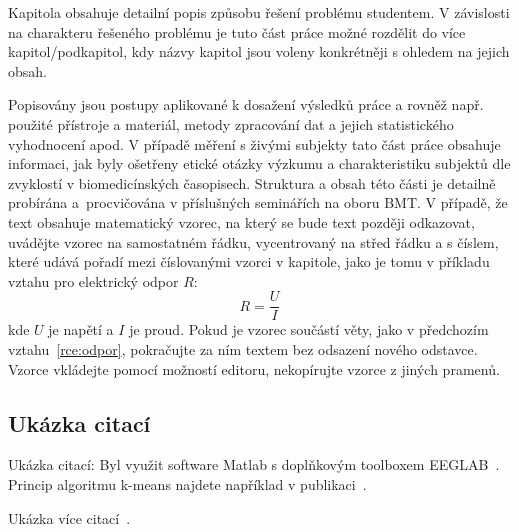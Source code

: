 Kapitola obsahuje detailní popis způsobu řešení problému studentem. 
V závislosti na charakteru řešeného problému je tuto část práce možné rozdělit do více kapitol/podkapitol, kdy názvy kapitol jsou voleny konkrétněji s ohledem na jejich obsah.

Popisovány jsou postupy aplikované k dosažení výsledků práce a rovněž např. použité přístroje a materiál, metody zpracování dat a jejich statistického vyhodnocení apod. 
V případě měření s živými subjekty tato část práce obsahuje informaci, jak byly ošetřeny etické otázky výzkumu a charakteristiku subjektů dle zvyklostí v biomedicínských časopisech.
Struktura a obsah této části je detailně probírána a~procvičována v příslušných seminářích na oboru BMT.
V případě, že text obsahuje matematický vzorec, na který se bude text později odkazovat, uvádějte vzorec na samostatném řádku, vycentrovaný na střed řádku a s číslem, které udává pořadí mezi číslovanými vzorci v kapitole, jako je tomu v příkladu vztahu pro elektrický odpor $R$:
\begin{equation}
	\label{rce:odpor}
	R = \frac{U}{I}
\end{equation}
kde $U$ je napětí a $I$ je proud. 
Pokud je vzorec součástí věty, jako v předchozím vztahu~\ref{rce:odpor}, pokračujte za ním textem bez odsazení nového odstavce. 
Vzorce vkládejte pomocí možností editoru, nekopírujte vzorce z jiných pramenů.  

\subsection{Ukázka citací}
Ukázka citací:
Byl využit software Matlab \cite{MATLAB} s doplňkovým toolboxem EEGLAB~\cite{eeglab}. 
Princip algoritmu k-means najdete například v publikaci~\cite{Krajca2011}.

Ukázka více citací~\cite{MATLAB, eeglab}.